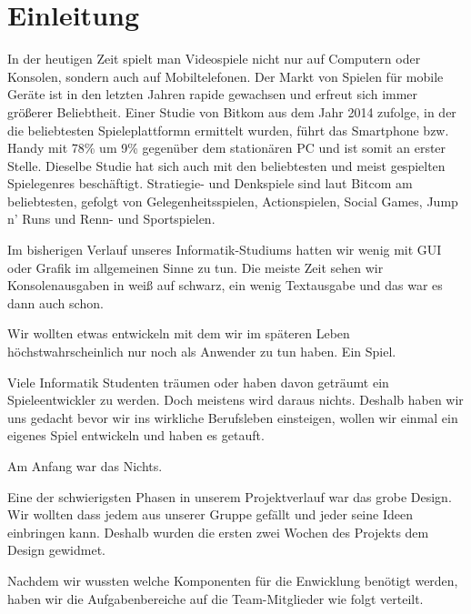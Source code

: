 \chapter{Einleitung}\label{ch:intro}

\label{sec:1_Ausgangssituation}

In der heutigen Zeit spielt man Videospiele nicht nur auf Computern oder Konsolen, sondern auch auf Mobiltelefonen. Der Markt von Spielen für mobile Geräte ist in den letzten Jahren rapide gewachsen und erfreut sich immer größerer Beliebtheit. Einer Studie von Bitkom \cite{bitkomgaming} aus dem Jahr 2014 zufolge, in der die beliebtesten Spieleplattformn ermittelt wurden, führt das Smartphone bzw. Handy mit 78\% um 9\% gegenüber dem stationären PC und ist somit an erster Stelle. Dieselbe Studie hat sich auch mit den beliebtesten und meist gespielten Spielegenres beschäftigt. Stratiegie- und Denkspiele sind laut Bitcom am beliebtesten, gefolgt von Gelegenheitsspielen, Actionspielen, Social Games, Jump n' Runs und Renn- und Sportspielen.




\label{sec:1_Motivation}

Im bisherigen Verlauf unseres Informatik-Studiums hatten wir wenig mit GUI oder Grafik im allgemeinen Sinne zu tun. Die meiste Zeit sehen wir Konsolenausgaben in weiß auf schwarz, ein wenig Textausgabe und das war es dann auch schon. 

Wir wollten etwas entwickeln mit dem wir im späteren Leben höchstwahrscheinlich nur noch als Anwender zu tun haben. Ein Spiel. 

Viele Informatik Studenten träumen oder haben davon geträumt ein Spieleentwickler zu werden. Doch meistens wird daraus nichts. Deshalb haben wir uns gedacht bevor wir ins wirkliche Berufsleben einsteigen, wollen wir einmal ein eigenes Spiel entwickeln und haben es \gamename getauft.



\label{sec:1_Vorgehen}

Am Anfang war das Nichts.

Eine der schwierigsten Phasen in unserem Projektverlauf war das grobe Design. Wir wollten dass  \gamename jedem aus unserer Gruppe gefällt und jeder seine Ideen einbringen kann. Deshalb wurden die ersten zwei Wochen des Projekts dem Design gewidmet. 

Nachdem wir wussten welche Komponenten für die Enwicklung benötigt werden, haben wir die Aufgabenbereiche auf die Team-Mitglieder wie folgt verteilt.

